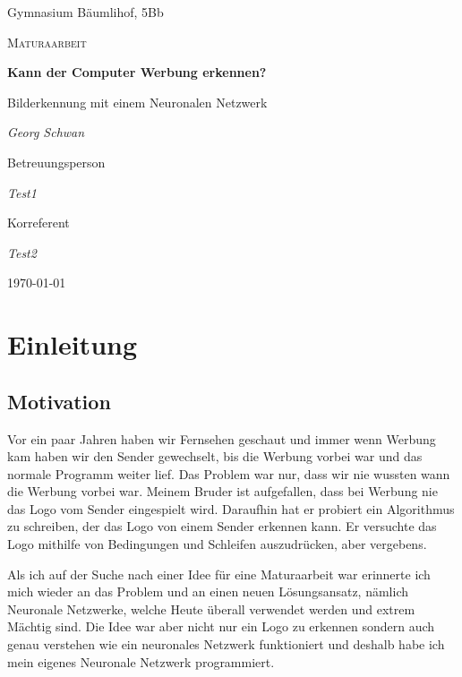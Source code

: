 \documentclass[12pt,a4paper]{report}
\begin{document}
\begin{titlepage}
	\centering
	{\Large Gymnasium Bäumlihof, 5Bb \par}
	\vspace{1cm}
	{\LARGE\scshape Maturaarbeit\par}
	\vspace{1.5cm}
	{\huge\bfseries Kann der Computer Werbung erkennen?\par}
	\vspace{0.6cm}
    {\Large Bilderkennung mit einem Neuronalen Netzwerk\par}
	\vspace{2cm}
	{\Large\itshape Georg Schwan\par}
	\vfill
	Betreuungsperson\par
	{\itshape Test1\par}
	Korreferent\par
	{\itshape Test2}
	\vfill
	{\large \today\par}
\end{titlepage}

\tableofcontents

\newpage

\chapter{Einleitung}\label{ch:einleitung}

\section{Motivation}
\label{sec:motivation}
Vor ein paar Jahren haben wir Fernsehen geschaut und immer wenn Werbung kam haben wir den Sender gewechselt,
bis die Werbung vorbei war und das normale Programm weiter lief.
Das Problem war nur, dass wir nie wussten wann die Werbung vorbei war.
Meinem Bruder ist aufgefallen, dass bei Werbung nie das Logo vom Sender eingespielt wird.
Daraufhin hat er probiert ein Algorithmus zu schreiben, der das Logo von einem Sender erkennen kann.
Er versuchte das Logo mithilfe von Bedingungen und Schleifen auszudrücken, aber vergebens.

Als ich auf der Suche nach einer Idee für eine Maturaarbeit war erinnerte ich mich wieder an das Problem und an einen neuen Lösungsansatz,
nämlich Neuronale Netzwerke, welche Heute überall verwendet werden und extrem Mächtig sind.
Die Idee war aber nicht nur ein Logo zu erkennen sondern auch genau verstehen wie ein neuronales Netzwerk funktioniert
und deshalb habe ich mein eigenes Neuronale Netzwerk programmiert.
\end{document}

